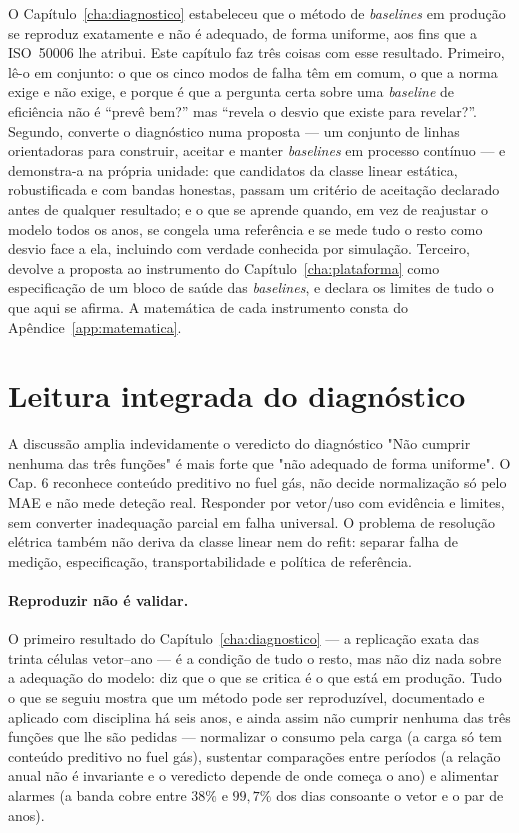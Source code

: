 O Capítulo~\ref{cha:diagnostico} estabeleceu que o método de \emph{baselines}
em produção se reproduz exatamente e não é adequado, de forma uniforme, aos
fins que a ISO~50006 lhe atribui. Este capítulo faz três coisas com esse
resultado. Primeiro, lê-o em conjunto: o que os cinco modos de falha têm em
comum, o que a norma exige e não exige, e porque é que a pergunta certa
sobre uma \emph{baseline} de eficiência não é ``prevê bem?'' mas ``revela o
desvio que existe para revelar?''. Segundo, converte o diagnóstico numa
proposta --- um conjunto de linhas orientadoras para construir, aceitar e
manter \emph{baselines} em processo contínuo --- e demonstra-a na própria
unidade: que candidatos da classe linear estática, robustificada e com
bandas honestas, passam um critério de aceitação declarado antes de
qualquer resultado; e o que se aprende quando, em vez de reajustar o modelo
todos os anos, se congela uma referência e se mede tudo o resto como desvio
face a ela, incluindo com verdade conhecida por simulação. Terceiro,
devolve a proposta ao instrumento do Capítulo~\ref{cha:plataforma} como
especificação de um bloco de saúde das \emph{baselines}, e declara os
limites de tudo o que aqui se afirma. A matemática de cada instrumento
consta do Apêndice~\ref{app:matematica}.

\section{Leitura integrada do diagnóstico}
\label{sec:leitura-integrada}

{A discussão amplia indevidamente o veredicto do diagnóstico}
{"Não cumprir nenhuma das três funções" é mais forte que "não adequado
de forma uniforme". O Cap. 6 reconhece conteúdo preditivo no fuel gás,
não decide normalização só pelo MAE e não mede deteção real. Responder
por vetor/uso com evidência e limites, sem converter inadequação parcial
em falha universal. O problema de resolução elétrica também não deriva
da classe linear nem do refit: separar falha de medição, especificação,
transportabilidade e política de referência.}%
\paragraph{Reproduzir não é validar.} O primeiro resultado do
Capítulo~\ref{cha:diagnostico} --- a replicação exata das trinta células
vetor--ano --- é a condição de tudo o resto, mas não diz nada sobre a
adequação do modelo: diz que o que se critica é o que está em produção.
Tudo o que se seguiu mostra que um método pode ser reproduzível, documentado
e aplicado com disciplina há seis anos, e ainda assim não cumprir nenhuma
das três funções que lhe são pedidas --- normalizar o consumo pela carga
(a carga só tem conteúdo preditivo no fuel gás), sustentar comparações entre
períodos (a relação anual não é invariante e o veredicto depende de onde
começa o ano) e alimentar alarmes (a banda cobre entre $38\%$ e $99{,}7\%$
dos dias consoante o vetor e o par de anos).

